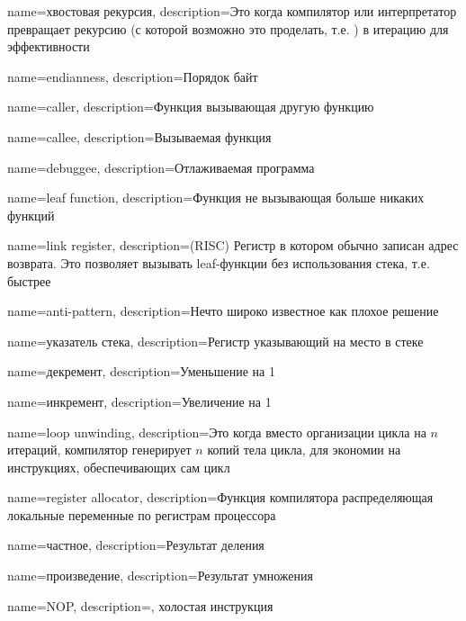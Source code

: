 {
  name=хвостовая рекурсия,
  description={Это когда компилятор или интерпретатор превращает рекурсию 
  (с которой возможно это проделать, т.е. ) в итерацию для эффективности}
}

{
  name=endianness,
  description={Порядок байт}
}

{
  name=caller,
  description={Функция вызывающая другую функцию}
}

{
  name=callee,
  description={Вызываемая функция}
}

{
  name=debuggee,
  description={Отлаживаемая программа}
}

{
  name=leaf function,
  description={Функция не вызывающая больше никаких функций}
}

{
  name=link register,
  description=(RISC) {Регистр в котором обычно записан адрес возврата.
  Это позволяет вызывать leaf-функции без использования стека, т.е. быстрее}
}

{
  name=anti-pattern,
  description={Нечто широко известное как плохое решение}
}

{
  name=указатель стека,
  description={Регистр указывающий на место в стеке}
}

{
  name=декремент,
  description={Уменьшение на 1}
}

{
  name=инкремент,
  description={Увеличение на 1}
}

{
  name=loop unwinding,
  description={Это когда вместо организации цикла на $n$ итераций, компилятор генерирует $n$ копий тела
  цикла, для экономии на инструкциях, обеспечивающих сам цикл}
}

{
  name=register allocator,
  description={Функция компилятора распределяющая локальные переменные по регистрам процессора}
}

{
  name=частное,
  description={Результат деления}
}

{
  name={произведение},
  description={Результат умножения}
}

{
  name=NOP,
  description={, холостая инструкция}
}

